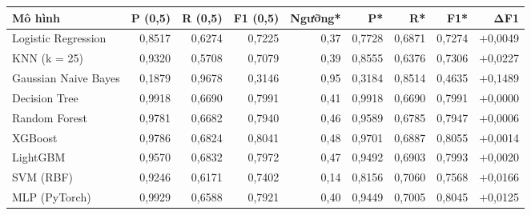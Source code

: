 \begin{tabular}{lrrrrrrrr}
\toprule
Mô hình & P (0,5) & R (0,5) & F1 (0,5) & Ngưỡng* & P* & R* & F1* & ΔF1 \\
\midrule
Logistic Regression & 0{,}8517 & 0{,}6274 & 0{,}7225 & 0{,}37 & 0{,}7728 & 0{,}6871 & 0{,}7274 & \ensuremath{+}0{,}0049 \\
KNN (k = 25) & 0{,}9320 & 0{,}5708 & 0{,}7079 & 0{,}39 & 0{,}8555 & 0{,}6376 & 0{,}7306 & \ensuremath{+}0{,}0227 \\
Gaussian Naive Bayes & 0{,}1879 & 0{,}9678 & 0{,}3146 & 0{,}95 & 0{,}3184 & 0{,}8514 & 0{,}4635 & \ensuremath{+}0{,}1489 \\
Decision Tree & 0{,}9918 & 0{,}6690 & 0{,}7991 & 0{,}41 & 0{,}9918 & 0{,}6690 & 0{,}7991 & \ensuremath{+}0{,}0000 \\
Random Forest & 0{,}9781 & 0{,}6682 & 0{,}7940 & 0{,}46 & 0{,}9589 & 0{,}6785 & 0{,}7947 & \ensuremath{+}0{,}0006 \\
XGBoost & 0{,}9786 & 0{,}6824 & 0{,}8041 & 0{,}48 & 0{,}9701 & 0{,}6887 & 0{,}8055 & \ensuremath{+}0{,}0014 \\
LightGBM & 0{,}9570 & 0{,}6832 & 0{,}7972 & 0{,}47 & 0{,}9492 & 0{,}6903 & 0{,}7993 & \ensuremath{+}0{,}0020 \\
SVM (RBF) & 0{,}9246 & 0{,}6171 & 0{,}7402 & 0{,}14 & 0{,}8156 & 0{,}7060 & 0{,}7568 & \ensuremath{+}0{,}0166 \\
MLP (PyTorch) & 0{,}9929 & 0{,}6588 & 0{,}7921 & 0{,}40 & 0{,}9449 & 0{,}7005 & 0{,}8045 & \ensuremath{+}0{,}0125 \\
\bottomrule
\end{tabular}
